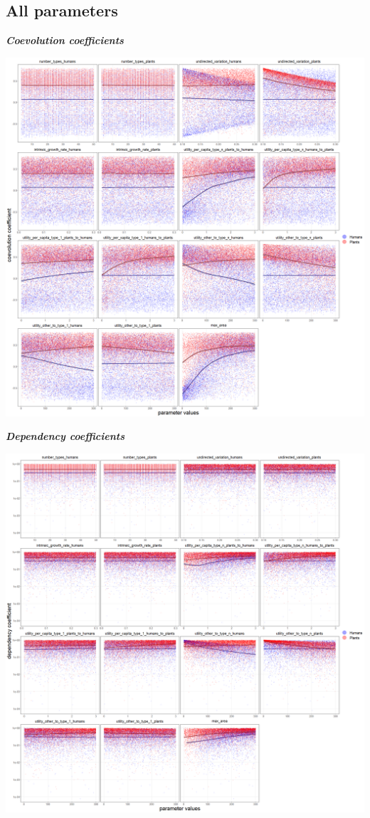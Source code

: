 \documentclass[
]{book}
\begin{document}
\newpage

\hypertarget{all-parameters}{%
\subsection{All parameters}\label{all-parameters}}

\textbf{\emph{Coevolution coefficients}}

\includegraphics[width=1\linewidth]{plots/5_LHS_coevolution_coefficients_bifurcationPlot_twoVariables_per_parameter}

\textbf{\emph{Dependency coefficients}}

\includegraphics[width=1\linewidth]{plots/5_LHS_dependency_coefficients_bifurcationPlot_twoVariables_per_parameter}
\end{document}
